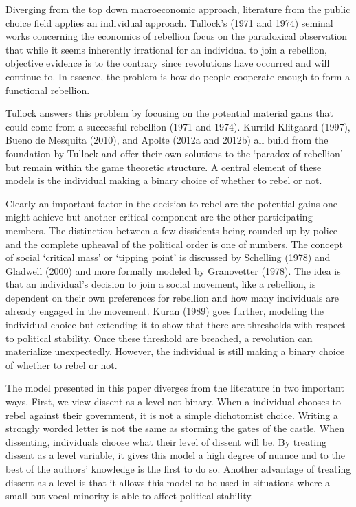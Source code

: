 \documentclass[12pt]{article}
\begin{document}
\begin{spacing}{1.5}


Diverging from the top down macroeconomic approach, literature from the public choice field applies an individual approach. Tullock's (1971 and 1974) seminal works concerning the economics of rebellion focus on the paradoxical observation that while it seems inherently irrational for an individual to join a rebellion, objective evidence is to the contrary since revolutions have occurred and will continue to. In essence, the problem is how do people cooperate enough to form a functional rebellion. 

Tullock answers this problem by focusing on the potential material gains that could come from a successful rebellion (1971 and 1974). Kurrild-Klitgaard (1997), Bueno de Mesquita (2010), and Apolte (2012a and 2012b) all build from the foundation by Tullock and offer their own solutions to the `paradox of rebellion' but remain within the game theoretic structure. A central element of these models is the individual making a binary choice of whether to rebel or not. 
 
Clearly an important factor in the decision to rebel are the potential gains one might achieve but another critical component are the other participating members. The distinction between a few dissidents being rounded up by police and the complete upheaval of the political order is one of numbers. The concept of social `critical mass' or `tipping point' is discussed by Schelling (1978) and Gladwell (2000) and more formally modeled by Granovetter (1978). The idea is that an individual's decision to join a social movement, like a rebellion, is dependent on their own preferences for rebellion and how many individuals are already engaged in the movement. Kuran (1989) goes further, modeling the individual choice but extending it to show that there are thresholds with respect to political stability. Once these threshold are breached, a revolution can materialize unexpectedly. However, the individual is still making a binary choice of whether to rebel or not. 


The model presented in this paper diverges from the literature in two important ways. First, we view dissent as a level not binary. When a individual chooses to rebel against their government, it is not a simple dichotomist choice. Writing a strongly worded letter is not the same as storming the gates of the castle. When dissenting, individuals choose what their level of dissent will be. By treating dissent as a level variable, it gives this model a high degree of nuance and to the best of the authors' knowledge is the first to do so. Another advantage of treating dissent as a level is that it allows this model to be used in situations where a small but vocal minority is able to affect political stability. 


\end{spacing}
\end{document}
